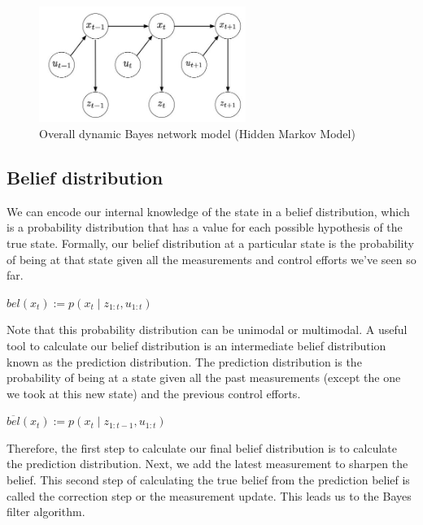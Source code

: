 \documentclass[twoside]{article}
\begin{document}
\begin{figure}[h!]
	\centering
    \includegraphics[width=0.6\textwidth]{img/HMV.jpg}
    \caption{Overall	dynamic	Bayes	
network	model (Hidden Markov Model)}
    \label{fig:cond_prob_example}
\end{figure}

\subsection{Belief distribution}
We can encode our internal knowledge of the state in a belief distribution, which is a probability distribution that has a value for each possible hypothesis of the true state. Formally, our belief distribution at a particular state is the probability of being at that state given all the measurements and control efforts we've seen so far. 

\begin{center}
$bel(x_t):=p(x_t\mid z_{1:t},u_{1:t})$
\end{center} 

Note that this probability distribution can be unimodal or multimodal. A useful tool to calculate our belief distribution is an intermediate belief distribution known as the prediction distribution. The prediction distribution is the probability of being at a state given all the past measurements (except the one we took at this new state) and the previous control efforts. 

\begin{center}
$\overline{bel}(x_t):=p(x_t\mid z_{1:t-1},u_{1:t})$
\end{center} 

Therefore, the first step to calculate our final belief distribution is to calculate the prediction distribution. Next, we add the latest measurement to sharpen the belief. This second step of calculating the true belief from the prediction belief is called the correction step or the measurement update.  This leads us to the Bayes filter algorithm. 
\end{document}
